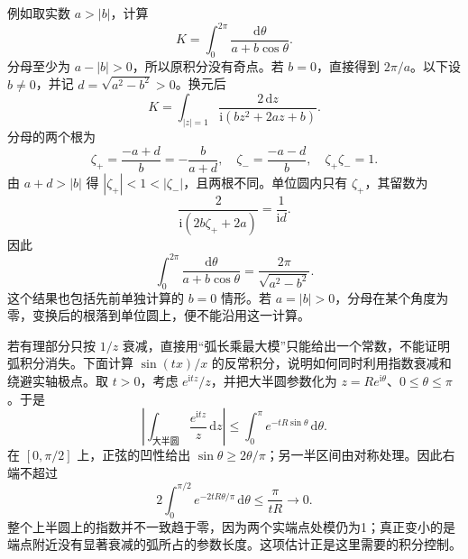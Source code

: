 \ProseParagraphBreak

例如取实数 \(a>|b|\)，计算
\[
 K=\int_0^{2\pi}\frac{\mathrm{d}\theta}{a+b\cos\theta}.
\]
分母至少为 \(a-|b|>0\)，所以原积分没有奇点。若 \(b=0\)，直接得到 \(2\pi/a\)。以下设 \(b\ne0\)，并记 \(d=\sqrt{a^2-b^2}>0\)。换元后
\[
 K=\int_{|z|=1}\frac{2\,\mathrm{d}z}
          {\mathrm{i}(bz^2+2az+b)}.
\]
分母的两个根为
\[
 \zeta_+=\frac{-a+d}{b}=-\frac{b}{a+d},\quad
 \zeta_-=\frac{-a-d}{b},\quad \zeta_+\zeta_-=1.
\]
由 \(a+d>|b|\) 得 \(|\zeta_+|<1<|\zeta_-|\)，且两根不同。单位圆内只有 \(\zeta_+\)，其留数为
\[
 \frac{2}{\mathrm{i}(2b\zeta_++2a)}
 =\frac1{\mathrm{i}d}.
\]
因此
\[
 \int_0^{2\pi}\frac{\mathrm{d}\theta}{a+b\cos\theta}
 =\frac{2\pi}{\sqrt{a^2-b^2}}.
\]
这个结果也包括先前单独计算的 \(b=0\) 情形。若 \(a=|b|>0\)，分母在某个角度为零，变换后的根落到单位圆上，便不能沿用这一计算。

\ProseParagraphBreak

若有理部分只按 \(1/z\) 衰减，直接用“弧长乘最大模”只能给出一个常数，不能证明弧积分消失。下面计算 \(\sin(tx)/x\) 的反常积分，说明如何同时利用指数衰减和绕避实轴极点。取 \(t>0\)，考虑 \(e^{\mathrm{i}tz}/z\)，并把大半圆参数化为 \(z=Re^{\mathrm{i}\theta}\)、\(0\le\theta\le\pi\)。于是
\[
 \left|\int_{\text{大半圆}}\frac{e^{\mathrm{i}tz}}z\,\mathrm{d}z\right|
 \le\int_0^\pi e^{-tR\sin\theta}\,\mathrm{d}\theta.
\]
在 \([0,\pi/2]\) 上，正弦的凹性给出 \(\sin\theta\ge2\theta/\pi\)；另一半区间由对称处理。因此右端不超过
\[
 2\int_0^{\pi/2}e^{-2tR\theta/\pi}\,\mathrm{d}\theta
 \le\frac{\pi}{tR}\longrightarrow0.
\]
整个上半圆上的指数并不一致趋于零，因为两个实端点处模仍为1；真正变小的是端点附近没有显著衰减的弧所占的参数长度。这项估计正是这里需要的积分控制。

\ProseParagraphBreak

